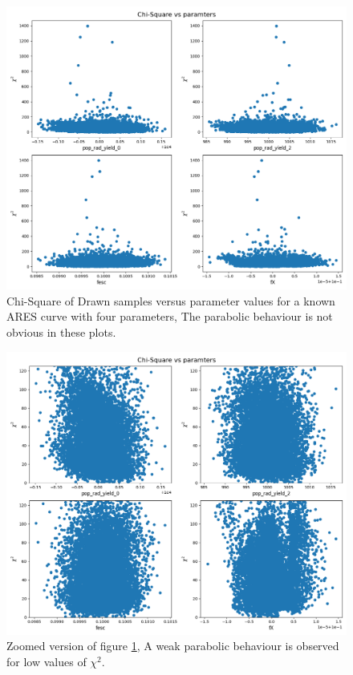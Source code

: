 \documentclass[12pt, TexShade, letterpaper]{report}
\begin{document}
\begin{figure}[h!]
\centering
\includegraphics[scale =0.5]{csq_vs_params_knwon_curve.png}
\caption[Chi-Square of Drawn samples vs parameter values]{Chi-Square of Drawn samples versus parameter values for a known ARES curve with four parameters, The parabolic behaviour is not obvious in these plots.}
\label{fig:csq_vs_params_knwon_curve}
\end{figure}

\begin{figure}[h!]
\centering
\includegraphics[scale =0.5]{csq_vs_params_zoomed_known_curve.png}
\caption[Chi-Square of Drawn samples vs parameter values, zoomed]{Zoomed version of figure \ref{fig:csq_vs_params_knwon_curve}, A weak parabolic behaviour is observed for low values of $\chi^2$.}
\label{fig:csq_vs_params_zoomed_known_curve}
\end{figure}
\end{document}

